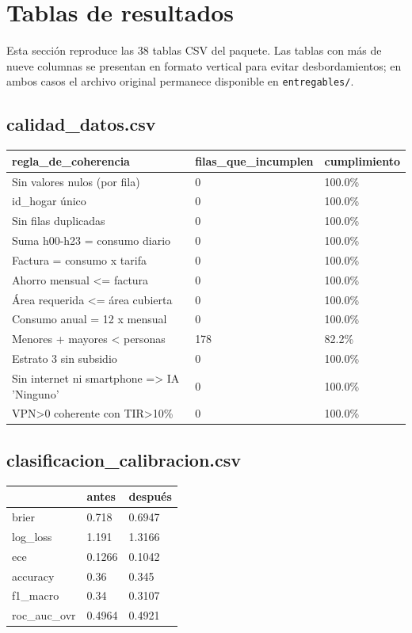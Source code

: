 \section{Tablas de resultados}
Esta sección reproduce las 38 tablas CSV del paquete. Las tablas con más de nueve columnas se presentan en formato vertical para evitar desbordamientos; en ambos casos el archivo original permanece disponible en \texttt{entregables/}.
\subsection*{calidad\_datos.csv}
{\footnotesize\begin{longtable}{@{}p{}ll@{}}
\toprule
regla\_de\_coherencia & filas\_que\_incumplen & cumplimiento \\
\midrule\endhead
Sin valores nulos (por fila) & 0 & 100.0\% \\
id\_hogar único & 0 & 100.0\% \\
Sin filas duplicadas & 0 & 100.0\% \\
Suma h00-h23 = consumo diario & 0 & 100.0\% \\
Factura = consumo x tarifa & 0 & 100.0\% \\
Ahorro mensual <= factura & 0 & 100.0\% \\
Área requerida <= área cubierta & 0 & 100.0\% \\
Consumo anual = 12 x mensual & 0 & 100.0\% \\
Menores + mayores < personas & 178 & 82.2\% \\
Estrato 3 sin subsidio & 0 & 100.0\% \\
Sin internet ni smartphone => IA 'Ninguno' & 0 & 100.0\% \\
VPN>0 coherente con TIR>10\% & 0 & 100.0\% \\
\bottomrule
\end{longtable}}
\subsection*{clasificacion\_calibracion.csv}
{\footnotesize\begin{longtable}{@{}lll@{}}
\toprule
 & antes & después \\
\midrule\endhead
brier & 0.718 & 0.6947 \\
log\_loss & 1.191 & 1.3166 \\
ece & 0.1266 & 0.1042 \\
accuracy & 0.36 & 0.345 \\
f1\_macro & 0.34 & 0.3107 \\
roc\_auc\_ovr & 0.4964 & 0.4921 \\
\bottomrule
\end{longtable}}
